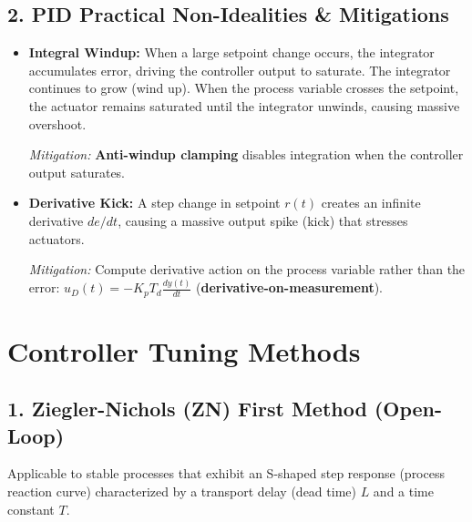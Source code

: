 \documentclass[12pt,a4paper]{article}
\begin{document}
\subsection{2. PID Practical Non-Idealities \& Mitigations}
\begin{itemize}[leftmargin=*, itemsep=2.5pt]
  \item \textbf{Integral Windup:} When a large setpoint change occurs, the integrator accumulates error, driving the controller output to saturate. The integrator continues to grow (wind up). When the process variable crosses the setpoint, the actuator remains saturated until the integrator unwinds, causing massive overshoot.
  
  \textit{Mitigation:} \textbf{Anti-windup clamping} disables integration when the controller output saturates.
  \item \textbf{Derivative Kick:} A step change in setpoint $r(t)$ creates an infinite derivative $de/dt$, causing a massive output spike (kick) that stresses actuators.
  
  \textit{Mitigation:} Compute derivative action on the process variable rather than the error: $u_D(t) = -K_p T_d \frac{dy(t)}{dt}$ (\textbf{derivative-on-measurement}).
\end{itemize}

\section{Controller Tuning Methods}

\subsection{1. Ziegler-Nichols (ZN) First Method (Open-Loop)}
Applicable to stable processes that exhibit an S-shaped step response (process reaction curve) characterized by a transport delay (dead time) $L$ and a time constant $T$.
\end{document}
